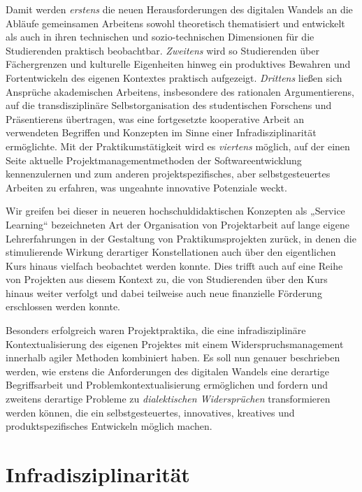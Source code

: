 \documentclass[a4paper,11pt]{article}
\begin{document}
Damit werden \emph{erstens} die neuen Herausforderungen des digitalen Wandels
an die Abläufe gemeinsamen Arbeitens sowohl theoretisch thematisiert und
entwickelt als auch in ihren technischen und sozio-technischen Dimensionen für
die Studierenden praktisch beobachtbar. \emph{Zweitens} wird so Studierenden
über Fächergrenzen und kulturelle Eigenheiten hinweg ein produktives Bewahren
und Fortentwickeln des eigenen Kontextes praktisch aufgezeigt. \emph{Drittens}
ließen sich Ansprüche akademischen Arbeitens, insbesondere des rationalen
Argumentierens, auf die transdisziplinäre Selbstorganisation des studentischen
Forschens und Präsentierens übertragen, was eine fortgesetzte kooperative
Arbeit an verwendeten Begriffen und Konzepten im Sinne einer
Infradisziplinarität ermöglichte. Mit der Praktikumstätigkeit wird es
\emph{viertens} möglich, auf der einen Seite aktuelle
Projektmanagementmethoden der Softwareentwicklung kennenzulernen und zum
anderen projektspezifisches, aber selbstgesteuertes Arbeiten zu erfahren, was
ungeahnte innovative Potenziale weckt.

Wir greifen bei dieser in neueren hochschuldidaktischen Konzepten als „Service
Learning“ bezeichneten Art der Organisation von Projektarbeit auf lange eigene
Lehrerfahrungen in der Gestaltung von Praktikumsprojekten zurück, in denen die
stimulierende Wirkung derartiger Konstellationen auch über den eigentlichen
Kurs hinaus vielfach beobachtet werden konnte. Dies trifft auch auf eine Reihe
von Projekten aus diesem Kontext zu, die von Studierenden über den Kurs hinaus
weiter verfolgt und dabei teilweise auch neue finanzielle Förderung
erschlossen werden konnte.

Besonders erfolgreich waren Projektpraktika, die eine infradisziplinäre
Kontextualisierung des eigenen Projektes mit einem Widerspruchsmanagement
innerhalb agiler Methoden kombiniert haben. Es soll nun genauer beschrieben
werden, wie erstens die Anforderungen des digitalen Wandels eine derartige
Begriffsarbeit und Problemkontextualisierung ermöglichen und fordern und
zweitens derartige Probleme zu \emph{dialektischen Widersprüchen}
transformieren werden können, die ein selbstgesteuertes, innovatives,
kreatives und produktspezifisches Entwickeln möglich machen.

\section*{Infradisziplinarität}
\end{document}
